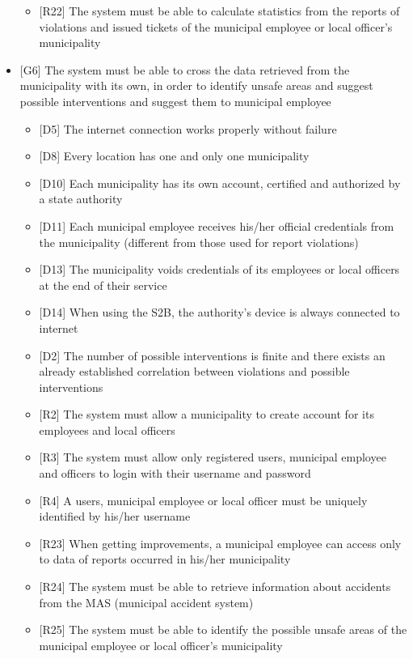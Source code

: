 \begin{itemize}
\begin{itemize}
								\item {[R22]} The system must be able to calculate statistics from the reports of violations and issued tickets of the municipal employee or local officer's municipality
							\end{itemize}
						\clearpage
						\item {[G6]} The system must be able to cross the data retrieved from the municipality with its own, in order to identify unsafe areas and suggest possible interventions and suggest them to municipal employee
							\begin{itemize}
								\item {[D5]} The internet connection works properly without failure
								\item {[D8]} Every location has one and only one municipality
								\item {[D10]} Each municipality has its own account, certified and authorized by a state authority
								\item {[D11]} Each municipal employee receives his/her official credentials from the municipality (different from those used for report violations)
								\item {[D13]} The municipality voids credentials of its employees or local officers at the end of their service
								\item {[D14]} When using the S2B, the authority's device is always connected to internet
								\item {[D2]} The number of possible interventions is finite and there exists an already established correlation between violations and possible interventions
								\item {[R2]} The system must allow a municipality to create account for its employees and local officers
								\item {[R3]} The system must allow only registered users, municipal employee and officers to login with their username and password
								\item {[R4]} A users, municipal employee or local officer must be uniquely identified by his/her username
								\item {[R23]} When getting improvements, a municipal employee can access only to data of reports occurred in his/her municipality
								\item {[R24]} The system must be able to retrieve information about accidents from the MAS (municipal accident system)
								\item {[R25]} The system must be able to identify the possible unsafe areas of the municipal employee or local officer's municipality

\end{itemize}
\end{itemize}

